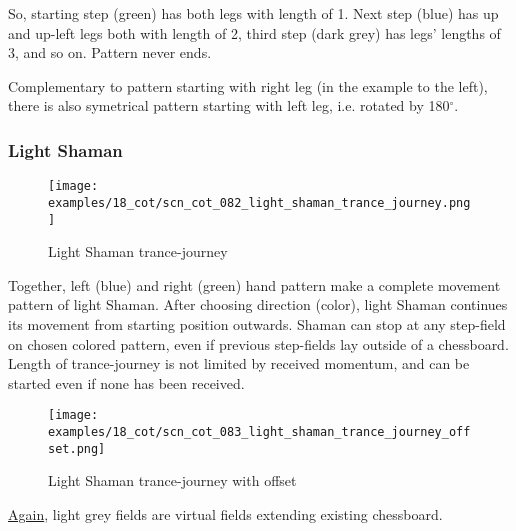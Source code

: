 So, starting step (green) has both legs with length of 1. Next step (blue)
has up and up-left legs both with length of 2, third step (dark grey) has
legs' lengths of 3, and so on. Pattern never ends.

Complementary to pattern starting with right leg (in the example to the
left), there is also symetrical pattern starting with left leg, i.e.
rotated by 180$^{\circ}$. %

\clearpage %

\subsubsection*{Light Shaman}
\label{sec:Conquest of Tlalocan/Trance-journey/Movement/Light Shaman}

\vspace*{-1.4\baselineskip}
\noindent
\begin{figure}[!h]
\texttt{[image: examples/18\_cot/scn\_cot\_082\_light\_shaman\_trance\_journey.png]}
\vspace*{-1.3\baselineskip}
\caption{Light Shaman trance-journey}
\label{fig:scn_cot_082_light_shaman_trance_journey}
\end{figure}

\vspace*{-0.5\baselineskip}
Together, left (blue) and right (green) hand pattern make a complete movement
pattern of light Shaman. After choosing direction (color), light Shaman
continues its movement from starting position outwards. Shaman can stop at
any step-field on chosen colored pattern, even if previous step-fields lay
outside of a chessboard. Length of trance-journey is not limited by received
momentum, and can be started even if none has been received.

\clearpage %

\noindent
\begin{figure}[!h]
\texttt{[image: examples/18\_cot/scn\_cot\_083\_light\_shaman\_trance\_journey\_offset.png]}
\caption{Light Shaman trance-journey with offset}
\label{fig:scn_cot_083_light_shaman_trance_journey_offset}
\end{figure}

\hyperref[fig:scn_hd_06_centaur_off_board]{Again},
light grey fields are virtual fields extending existing chessboard.

